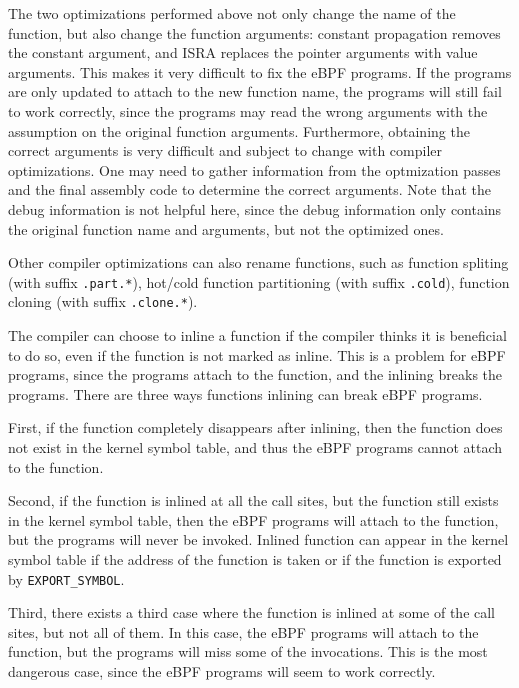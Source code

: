 The two optimizations performed above not only change the name of the function, but also change the function arguments: constant propagation removes the constant argument, and ISRA replaces the pointer arguments with value arguments.
This makes it very difficult to fix the eBPF programs.
If the programs are only updated to attach to the new function name, the programs will still fail to work correctly, since the programs may read the wrong arguments with the assumption on the original function arguments.
Furthermore, obtaining the correct arguments is very difficult and subject to change with compiler optimizations. One may need to gather information from the optmization passes and the final assembly code to determine the correct arguments. 
Note that the debug information is not helpful here, since the debug information only contains the original function name and arguments, but not the optimized ones.

Other compiler optimizations can also rename functions, such as function spliting (with suffix \texttt{.part.*}), hot/cold function partitioning (with suffix \texttt{.cold}), function cloning (with suffix \texttt{.clone.*}).





The compiler can choose to inline a function if the compiler thinks it is beneficial to do so, even if the function is not marked as inline.
This is a problem for eBPF programs, since the programs attach to the function, and the inlining breaks the programs.
There are three ways functions inlining can break eBPF programs.

First, if the function completely disappears after inlining, then the function does not exist in the kernel symbol table, and thus the eBPF programs cannot attach to the function.

Second, if the function is inlined at all the call sites, but the function still exists in the kernel symbol table, then the eBPF programs will attach to the function, but the programs will never be invoked. Inlined function can appear in the kernel symbol table if the address of the function is taken or if the function is exported by \texttt{EXPORT\_SYMBOL}.

Third, there exists a third case where the function is inlined at some of the call sites, but not all of them. In this case, the eBPF programs will attach to the function, but the programs will miss some of the invocations. This is the most dangerous case, since the eBPF programs will seem to work correctly. 

